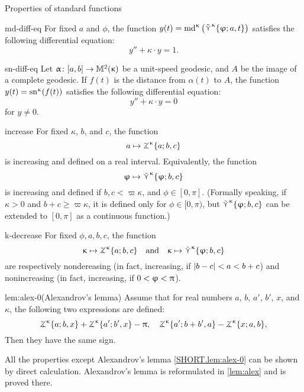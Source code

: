 \begin{thm}{Properties of standard functions}\label{md-equalities}

\begin{subthm}{md-diff-eq}
For fixed $a$ and $\phi$, the function $y(t)=\mathrm{md}^{\upkappa}\left(\mathop{\tilde\curlyvee}\nolimits^{\upkappa}\{\upvarphi;a,t\}\right)$
 satisfies the following differential equation:
\[y''+\kappa\cdot y=1.\]
\end{subthm}

\begin{subthm}{sn-diff-eq}
Let $\alpha\:[a,b]\to\Lob2\kappa$ be a unit-speed geodesic, and $A$ be the image of a complete geodesic. If $f(t)$ is the distance from $\alpha(t)$ to $A$, the function 
$y(t)=\mathrm{sn}^{\upkappa} (f(t))$
 satisfies the following differential equation:
\[y''+\kappa\cdot y=0\]
for $y\ne 0$.
\end{subthm}

\begin{subthm}{increase}
For fixed $\kappa$, $b$, and $c$, the function 
\[a\mapsto\tangle\mc\kappa\{a;b,c\}\]
is increasing and defined on a real interval.
Equivalently, the function
\[\phi\mapsto\side\kappa \{\phi;b,c\}\]
is increasing and defined if $b,c<\varpi\kappa$, and $\phi\in[0,\pi]$.
(Formally speaking, if $\kappa>0$ and $b+c\ge \varpi\kappa$, it is defined only for $\phi\in[0,\pi)$, but $\mathop{\tilde\curlyvee}\nolimits^{\upkappa} \{\upvarphi;b,c\}$ can be extended to $[0,\pi]$ as a continuous function.)
\end{subthm}

\begin{subthm}{k-decrease}
For fixed $\phi,a,b,c$, the function
\[\kappa\mapsto \tangle\mc\kappa\{a;b,c\}\quad \text{and}\quad \kappa\mapsto \side\kappa \{\phi;b,c\}\]
are respectively nondereasing (in fact, increasing, if $|b\z-c|\z<a\z< b+c$)
and nonincreasing (in fact, increasing, if $0\z<\phi\z<\pi$).
\end{subthm}

\begin{subthm}{lem:alex-0}(Alexandrov's lemma)
Assume that for real numbers $a$, $b$, $a'$, $b'$, $x$, and $\kappa$, the following two expressions are defined:
\[\tangle\mc\kappa\{a;b,x\}+\tangle\mc\kappa\{a';b',x\}-\pi,\quad
\tangle\mc\kappa\{a';b+b',a\}-\tangle\mc\kappa\{x;a,b\},\]
Then they have the same sign.
\end{subthm}
\end{thm}

All the properties except Alexandrov's lemma \ref{SHORT.lem:alex-0} can be shown by direct calculation. Alexandrov's lemma is reformulated in \ref{lem:alex} and is proved there.

